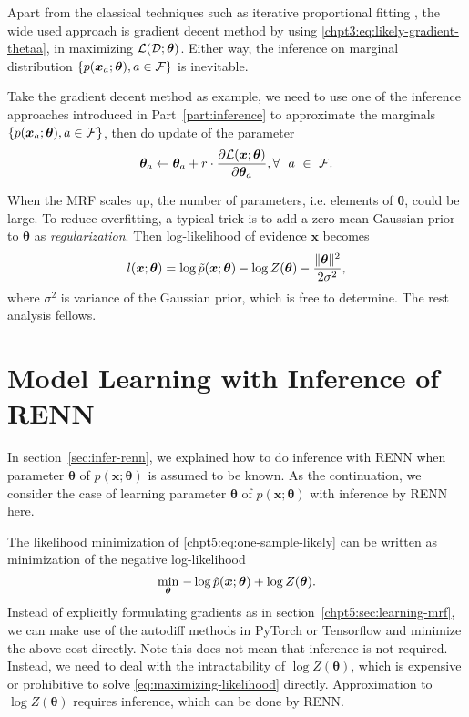 Apart from the classical techniques such as iterative proportional fitting \cite[section~6.1]{wainwright2008graphical}\cite{eric10-708ipf}, the wide used approach is gradient decent method by using \eqref{chpt3:eq:likely-gradient-thetaa}, in maximizing $\mathcal{L}(\mathcal{D}; \bm{\theta})$. Either way, the inference on marginal distribution $\left\{ p(\bm{x}_a; \bm{\theta}), a \in \mathcal{F} \right\}$ is inevitable.

Take the gradient decent method as example, we need to use one of the inference approaches introduced in Part~\ref{part:inference} to approximate the marginals $\left\{ p(\bm{x}_a; \bm{\theta}), a \in \mathcal{F} \right\}$, then do update of the parameter
\begin{equation}
  \bm{\theta}_a \leftarrow \bm{\theta}_a + r \cdot \frac{ \partial \mathcal{L}(\bm{x};\bm{\theta})}{\partial \bm{\theta}_a}, \forall~~a~\in~\mathcal{F}.
\end{equation}

\begin{remark}
  When the MRF scales up, the number of parameters, i.e. elements of $\bm{\theta}$, could be large. To reduce overfitting, a typical trick is to add a zero-mean Gaussian prior to $\bm{\theta}$ as \textit{regularization}. Then log-likelihood of evidence $\bm{x}$ becomes 
  \begin{equation}
    l(\bm{x};\bm{\theta}) = \log{\tilde{p}(\bm{x}; \bm{\theta})} - \log{Z(\bm{\theta})} - \frac{\| \bm{\theta} \|^2}{2\sigma^2},
  \end{equation}
  where $\sigma^2$ is variance of the Gaussian prior, which is free to determine. The rest analysis fellows.
\end{remark}


\section{Model Learning with Inference of RENN}
\label{sec:model-learning-with-renn}
In section~\ref{sec:infer-renn}, we explained how to do inference with RENN when parameter $\bm{\theta}$ of $p(\bm{x}; \bm{\theta})$ is assumed to be known. As the continuation, we consider the case of learning parameter $\bm{\theta}$ of $p(\bm{x}; \bm{\theta})$ with inference by RENN here.

The likelihood minimization of \eqref{chpt5:eq:one-sample-likely} can be written as minimization of the negative log-likelihood
\begin{equation}\label{eq:maximizing-likelihood}
  \underset{\bm{\theta}}{\min}\;{ -\log{\tilde{p}(\bm{x}; \bm{\theta})} + \log{Z(\bm{\theta})}}.
\end{equation}
Instead of explicitly formulating gradients as in section~\ref{chpt5:sec:learning-mrf}, we can make use of the autodiff methods in PyTorch or Tensorflow and minimize the above cost directly. Note this does not mean that inference is not required. Instead, we need to deal with the intractability of $\log{Z(\bm{\theta})}$, which is expensive or prohibitive to solve \eqref{eq:maximizing-likelihood} directly. Approximation to $\log{Z(\bm{\theta})}$ requires inference, which can be done by RENN. 

